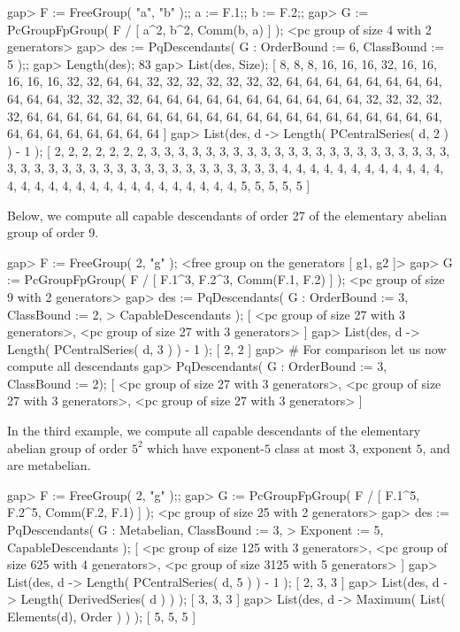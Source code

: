 \beginexample
gap> F := FreeGroup( "a", "b" );; a := F.1;; b := F.2;;         
gap> G := PcGroupFpGroup( F / [ a^2, b^2, Comm(b, a) ] );
<pc group of size 4 with 2 generators>
gap> des := PqDescendants( G : OrderBound := 6, ClassBound := 5 );;
gap> Length(des);
83
gap> List(des, Size); 
[ 8, 8, 8, 16, 16, 16, 32, 16, 16, 16, 16, 16, 32, 32, 64, 64, 32, 32, 32, 
  32, 32, 32, 32, 64, 64, 64, 64, 64, 64, 64, 64, 64, 64, 64, 32, 32, 32, 32, 
  64, 64, 64, 64, 64, 64, 64, 64, 64, 64, 64, 32, 32, 32, 32, 32, 64, 64, 64, 
  64, 64, 64, 64, 64, 64, 64, 64, 64, 64, 64, 64, 64, 64, 64, 64, 64, 64, 64, 
  64, 64, 64, 64, 64, 64, 64 ]
gap> List(des, d -> Length( PCentralSeries( d, 2 ) ) - 1 );
[ 2, 2, 2, 2, 2, 2, 2, 3, 3, 3, 3, 3, 3, 3, 3, 3, 3, 3, 3, 3, 3, 3, 3, 3, 3, 
  3, 3, 3, 3, 3, 3, 3, 3, 3, 3, 3, 3, 3, 3, 3, 3, 3, 3, 3, 3, 3, 3, 3, 3, 4, 
  4, 4, 4, 4, 4, 4, 4, 4, 4, 4, 4, 4, 4, 4, 4, 4, 4, 4, 4, 4, 4, 4, 4, 4, 4, 
  4, 4, 4, 5, 5, 5, 5, 5 ]
\endexample

Below, we compute all capable descendants of order 27 of  the  elementary
abelian group of order 9.

\beginexample
gap> F := FreeGroup( 2, "g" );
<free group on the generators [ g1, g2 ]>
gap> G := PcGroupFpGroup( F / [ F.1^3, F.2^3, Comm(F.1, F.2) ] );
<pc group of size 9 with 2 generators>
gap> des := PqDescendants( G : OrderBound := 3, ClassBound := 2,
>                              CapableDescendants );
[ <pc group of size 27 with 3 generators>, 
  <pc group of size 27 with 3 generators> ]
gap> List(des, d -> Length( PCentralSeries( d, 3 ) ) - 1 );
[ 2, 2 ]
gap> # For comparison let us now compute all descendants
gap> PqDescendants( G : OrderBound := 3, ClassBound := 2);
[ <pc group of size 27 with 3 generators>, 
  <pc group of size 27 with 3 generators>, 
  <pc group of size 27 with 3 generators> ]
\endexample

In  the  third  example,  we  compute  all  capable  descendants  of  the
elementary abelian group of order  $5^2$ which have exponent-$5$ class at
most $3$, exponent $5$, and are metabelian.

\beginexample
gap> F := FreeGroup( 2, "g" );;                                  
gap> G := PcGroupFpGroup( F / [ F.1^5, F.2^5, Comm(F.2, F.1) ] );
<pc group of size 25 with 2 generators>
gap> des := PqDescendants( G : Metabelian, ClassBound := 3,
>                              Exponent := 5, CapableDescendants );
[ <pc group of size 125 with 3 generators>, 
  <pc group of size 625 with 4 generators>, 
  <pc group of size 3125 with 5 generators> ]
gap> List(des, d -> Length( PCentralSeries( d, 5 ) ) - 1 );
[ 2, 3, 3 ]
gap> List(des, d -> Length( DerivedSeries( d ) ) );
[ 3, 3, 3 ]
gap> List(des, d -> Maximum( List( Elements(d), Order ) ) );     
[ 5, 5, 5 ]
\endexample

